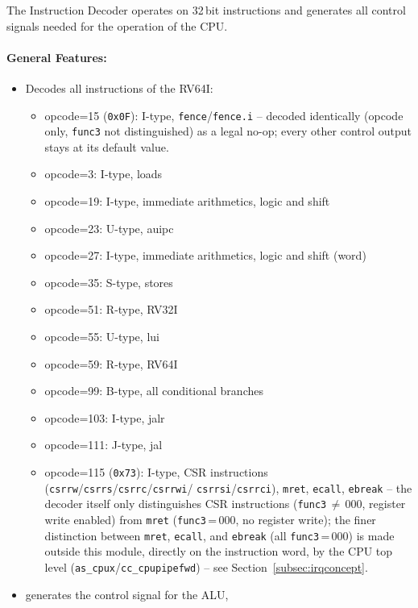 The Instruction Decoder operates on 32\,bit instructions and generates all control signals needed for the operation of the CPU.

\paragraph{General Features: }
\begin{itemize}
  \item Decodes all instructions of the RV64I:
  \begin{itemize}
    \item opcode=15 (\texttt{0x0F}): I-type, \texttt{fence}/\texttt{fence.i} --
      decoded identically (opcode only, \texttt{func3} not distinguished) as
      a legal no-op; every other control output stays at its default value.
    \item opcode=3: I-type, loads
    \item opcode=19: I-type, immediate arithmetics, logic and shift
    \item opcode=23: U-type, auipc
    \item opcode=27: I-type, immediate arithmetics, logic and shift (word)
    \item opcode=35: S-type, stores
    \item opcode=51: R-type, RV32I
    \item opcode=55: U-type, lui
    \item opcode=59: R-type, RV64I
    \item opcode=99: B-type, all conditional branches
    \item opcode=103: I-type, jalr
    \item opcode=111: J-type, jal
    \item opcode=115 (\texttt{0x73}): I-type, CSR instructions
      (\texttt{csrrw}/\texttt{csrrs}/\texttt{csrrc}/\texttt{csrrwi}/
      \texttt{csrrsi}/\texttt{csrrci}), \texttt{mret}, \texttt{ecall},
      \texttt{ebreak} -- the decoder itself only distinguishes CSR
      instructions (\texttt{func3}\,$\neq$\,000, register write enabled)
      from \texttt{mret} (\texttt{func3}\,=\,000, no register write); the
      finer distinction between \texttt{mret}, \texttt{ecall}, and
      \texttt{ebreak} (all \texttt{func3}\,=\,000) is made outside this
      module, directly on the instruction word, by the CPU top level
      (\texttt{as\_cpux}/\texttt{cc\_cpupipefwd}) -- see
      Section~\ref{subsec:irqconcept}.
  \end{itemize}
  \item generates the control signal for the ALU,

\end{itemize}
